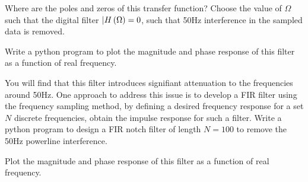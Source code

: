 \documentclass[9pt]{article}
\def\lp{\ensuremath\left(}
\def\rp{\ensuremath\right)}
\begin{document}
\begin{multicols}{2}
\begin{enumerate}
        Where are the poles and zeros of this transfer function? Choose the value of $\Omega$ such that the digital filter $\lvert H\lp \Omega \rp = 0$, such that 50Hz interference in the sampled data is removed.

        Write a python program to plot the magnitude and phase response of this filter as a function of real frequency.

        You will find that this filter introduces signifiant attenuation to the frequencies around 50Hz. One approach to address this issue is to develop a FIR filter using the frequency sampling method, by defining a desired frequency response for a set $N$ discrete frequencies, obtain the impulse response for such a filter. Write a python program to design a FIR notch filter of length $N=100$ to remove the 50Hz powerline interference.

        Plot the magnitude and phase response of this filter as a function of real frequency.

    \end{enumerate}
    \vfill
\end{multicols}
\end{document}
